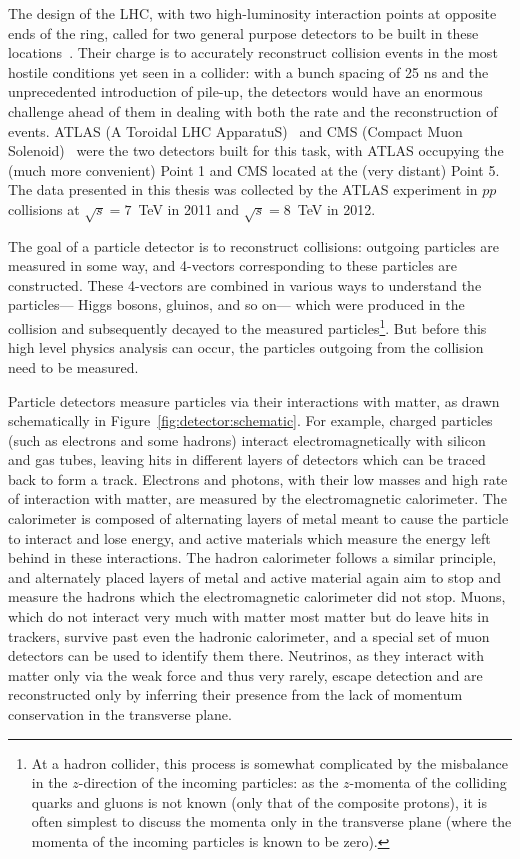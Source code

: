 \label{chapter:detector}

The design of the LHC, with two high-luminosity interaction points at opposite ends of the ring, called for two general purpose detectors to be built in these locations~\cite{LHCCDR}. Their charge is to accurately reconstruct collision events in the most hostile conditions yet seen in a collider: with a bunch spacing of 25 ns and the unprecedented introduction of pile-up, the detectors would have an enormous challenge ahead of them in dealing with both the rate and the reconstruction of events. ATLAS (A Toroidal LHC ApparatuS)~\cite{ATLASPaper} and CMS (Compact Muon Solenoid)~\cite{CMSPaper} were the two detectors built for this task, with ATLAS occupying the (much more convenient) Point 1 and CMS located at the (very distant) Point 5. The data presented in this thesis was collected by the ATLAS experiment in $pp$ collisions at $\sqrt{s} = 7$~TeV in 2011 and $\sqrt{s} = 8$~TeV in 2012.

The goal of a particle detector is to reconstruct collisions: outgoing particles are measured in some way, and 4-vectors corresponding to these particles are constructed. These 4-vectors are combined in various ways to understand the particles--- Higgs bosons, gluinos, and so on--- which were produced in the collision and subsequently decayed to the measured particles\footnote{At a hadron collider, this process is somewhat complicated by the misbalance in the $z$-direction of the incoming particles: as the $z$-momenta of the colliding quarks and gluons is not known (only that of the composite protons), it is often simplest to discuss the momenta only in the transverse plane (where the momenta of the incoming particles is known to be zero).}. But before this high level physics analysis can occur, the particles outgoing from the collision need to be measured.

Particle detectors measure particles via their interactions with matter, as drawn schematically in Figure~\ref{fig:detector:schematic}. For example, charged particles (such as electrons and some hadrons) interact electromagnetically with silicon and gas tubes, leaving hits in different layers of detectors which can be traced back to form a track. Electrons and photons, with their low masses and high rate of interaction with matter, are measured by the electromagnetic calorimeter. The calorimeter is composed of alternating layers of metal meant to cause the particle to interact and lose energy, and active materials which measure the energy left behind in these interactions. The hadron calorimeter follows a similar principle, and alternately placed layers of metal and active material again aim to stop and measure the hadrons which the electromagnetic calorimeter did not stop. Muons, which do not interact very much with matter most matter but do leave hits in trackers, survive past even the hadronic calorimeter, and a special set of muon detectors can be used to identify them there. Neutrinos, as they interact with matter only via the weak force and thus very rarely, escape detection and are reconstructed only by inferring their presence from the lack of momentum conservation in the transverse plane.

